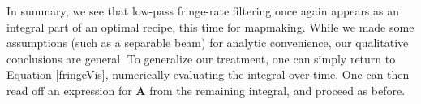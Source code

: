 \documentclass[twocolumn,apj,numberedappendix]{emulateapj}
\newcommand{\rhat}{\hat{\mathbf{r}}}
\begin{document}
In summary, we see that low-pass fringe-rate filtering once again appears as an integral part of an optimal
recipe, this time for mapmaking. While we made some assumptions (such as a separable beam) for analytic
convenience, our qualitative conclusions are general. To generalize our treatment, one can simply return
to Equation \eqref{fringeVis}, numerically evaluating the integral over time. One can then read off an expression
for $\mathbf{A}$ from the remaining integral, and proceed as before.
%
%
\end{document}
